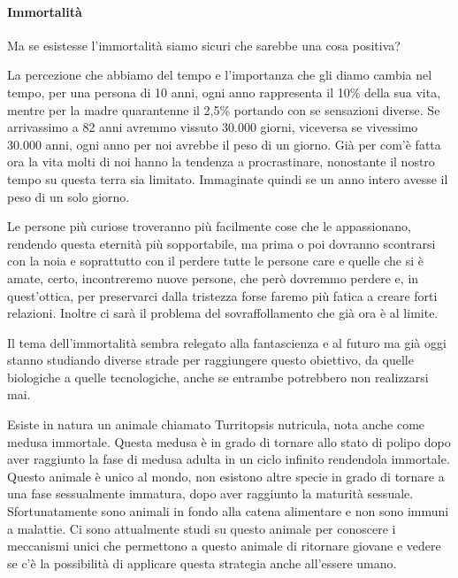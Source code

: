 \documentclass[12pt]{book} %
\begin{document}
\paragraph{Immortalità}

Ma se esistesse l'immortalità siamo sicuri che sarebbe una cosa positiva?

La percezione che abbiamo del tempo e l'importanza che gli diamo cambia nel tempo, per una persona
di 10 anni, ogni anno rappresenta il 10\% della sua vita, mentre per la madre quarantenne il 2,5\% portando con se
sensazioni diverse. Se arrivassimo a 82 anni avremmo vissuto 30.000 giorni, viceversa se vivessimo 30.000 anni, ogni
anno per noi avrebbe il peso di un giorno. Già per com'è fatta ora la vita molti di noi hanno la
tendenza a procrastinare, nonostante il nostro tempo su questa terra sia limitato. Immaginate quindi se un anno intero
avesse il peso di un solo giorno.

Le persone più curiose troveranno più facilmente cose che le appassionano, rendendo questa eternità più sopportabile, ma
prima o poi dovranno scontrarsi con la noia e soprattutto con il perdere tutte le persone care e quelle che si è amate,
certo, incontreremo nuove persone, che però dovremmo perdere e, in quest'ottica, per preservarci dalla tristezza forse faremo più fatica a creare forti relazioni. Inoltre ci sarà il problema del sovraffollamento che già ora è al limite.

Il tema dell'immortalità sembra relegato alla fantascienza e al futuro ma già oggi stanno studiando
diverse strade per raggiungere questo obiettivo, da quelle biologiche a quelle tecnologiche, anche se entrambe potrebbero non realizzarsi mai. 

Esiste in natura un animale chiamato Turritopsis nutricula, nota anche come medusa immortale. Questa medusa è in grado
di tornare allo stato di polipo dopo aver raggiunto la fase di medusa adulta in un ciclo infinito rendendola immortale.
Questo animale è unico al mondo, non esistono altre specie in grado di tornare a una fase sessualmente immatura, dopo
aver raggiunto la maturità sessuale. 
Sfortunatamente sono animali in fondo alla catena alimentare e non sono immuni a malattie. Ci sono attualmente studi su
questo animale per conoscere i meccanismi unici che permettono a questo animale di ritornare giovane e vedere se
c'è la possibilità di applicare questa strategia anche all'essere umano.
\end{document}
